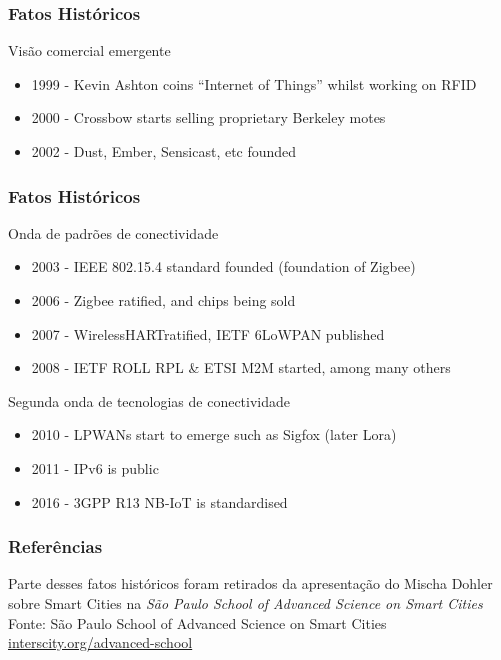 \documentclass[t]{beamer}
\begin{document}
\begin{frame}
\frametitle{Fatos Históricos}
Visão comercial emergente

\begin{itemize}
	\item 1999 - Kevin Ashton coins “Internet of Things” whilst working on RFID
	\item 2000 - Crossbow starts selling proprietary Berkeley motes
	\item 2002 - Dust, Ember, Sensicast, etc founded
\end{itemize}

\end{frame}

\begin{frame}
\frametitle{Fatos Históricos}

Onda de padrões de conectividade

\begin{itemize}
	\item 2003 - IEEE 802.15.4 standard founded (foundation of Zigbee)
	\item 2006 - Zigbee ratified, and chips being sold
	\item 2007 - WirelessHARTratified, IETF 6LoWPAN published
	\item 2008 - IETF ROLL RPL \& ETSI M2M started, among many others
\end{itemize}

Segunda onda de tecnologias de conectividade

\begin{itemize}
	\item 2010 - LPWANs start to emerge such as Sigfox (later Lora)
	\item 2011 - IPv6 is public
	\item 2016 - 3GPP R13 NB-IoT is standardised
\end{itemize}

\end{frame}

\begin{frame}
	\frametitle{Referências}
	Parte desses fatos históricos foram retirados da apresentação do Mischa Dohler sobre Smart Cities na \textit{São Paulo School of Advanced Science on Smart Cities}\\
	\bigskip
	\scriptsize Fonte: São Paulo School of Advanced Science on Smart Cities\\
	\tiny \url{interscity.org/advanced-school}
\end{frame}
\end{document}
